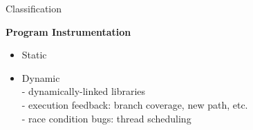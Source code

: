 \documentclass[10pt,aspectratio=43]{beamer}
\begin{document}
\begin{frame}{Classification}
{        \begin{minipage}[t]{0.4\linewidth}
            \vspace{0pt}
            \centering 
            \textbf{Program Instrumentation}
            \scriptsize{
                \begin{itemize}
                    \item Static
                    \item \alert{Dynamic} 
                        \\- dynamically-linked libraries
                        \\- execution feedback: branch coverage, new path, etc.
                        \\- race condition bugs: thread scheduling
                \end{itemize}
                }
        \end{minipage}
    }
\end{frame}
\end{document}
